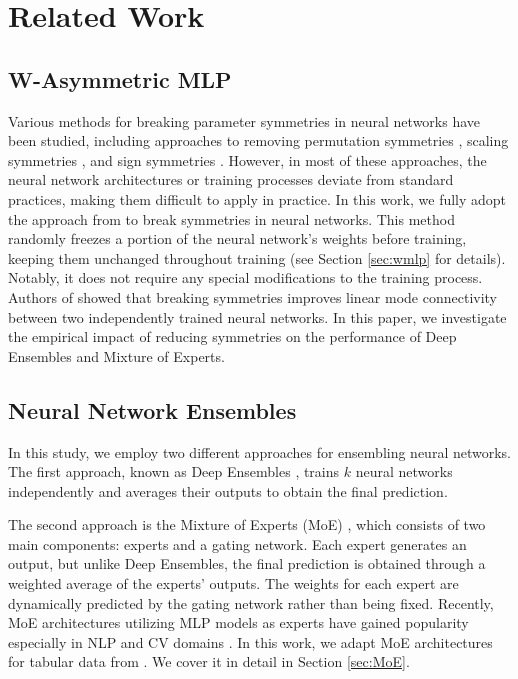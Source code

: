 \section{Related Work}
\subsection{W-Asymmetric MLP}
Various methods for breaking parameter symmetries in neural networks have been studied, including approaches to removing permutation symmetries \cite{pourzanjani2017improving, pittorino2022deep}, scaling symmetries \cite{badrinarayanan2015understanding}, and sign symmetries \cite{wiese2023towards}. However, in most of these approaches, the neural network architectures or training processes deviate from standard practices, making them difficult to apply in practice. In this work, we fully adopt the approach from \cite{lim2024empirical} to break symmetries in neural networks. This method randomly freezes a portion of the neural network’s weights before training, keeping them unchanged throughout training (see Section \ref{sec:wmlp} for details). Notably, it does not require any special modifications to the training process. Authors of \cite{lim2024empirical} showed that breaking symmetries improves linear mode connectivity between two independently trained neural networks. In this paper, we investigate the empirical impact of reducing symmetries on the performance of Deep Ensembles and Mixture of Experts.

\subsection{Neural Network Ensembles}
In this study, we employ two different approaches for ensembling neural networks. The first approach, known as Deep Ensembles \cite{lakshminarayanan2017simple}, trains $k$ neural networks independently and averages their outputs to obtain the final prediction.

The second approach is the Mixture of Experts (MoE) \cite{yuksel2012twenty}, which consists of two main components: experts and a gating network. Each expert generates an output, but unlike Deep Ensembles, the final prediction is obtained through a weighted average of the experts' outputs. The weights for each expert are dynamically predicted by the gating network rather than being fixed. Recently, MoE architectures utilizing MLP models as experts have gained popularity \cite{fedus2022review} especially in NLP \cite{du2022glam}
and CV domains \cite{puigcerver2023sparse,
riquelme2021scaling}. In this work, we adapt MoE architectures for tabular data from \cite{chernov2025moe}. We cover it in detail in Section \ref{sec:MoE}.